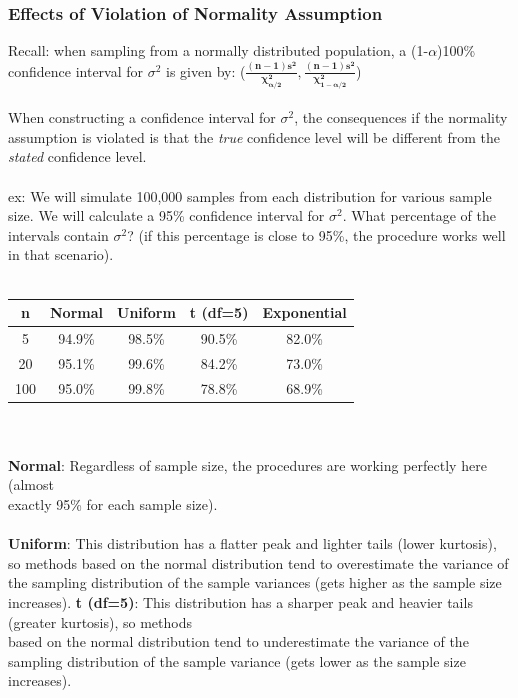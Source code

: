 \documentclass[12pt, a4paper]{article}
\begin{document}
	\subsubsection{Effects of Violation of Normality Assumption}
	Recall: when sampling from a normally distributed population, a (1-$\alpha$)100\% confidence interval for $\sigma^2$ is given by: ($\bm{\frac{(n-1)s^2}{\chi^2_{\alpha/2}}, \frac{(n-1)s^2}{\chi^2_{1-\alpha/2}}}$) \\~\\
	When constructing a confidence interval for $\sigma^2$, the consequences if the normality assumption is violated is that the \textit{true} confidence level will be different from the \textit{stated} confidence level. \\~\\
	ex: We will simulate 100,000 samples from each distribution for various sample size. We will calculate a 95\% confidence interval for $\sigma^2$. What percentage of the intervals contain $\sigma^2$? (if this percentage is close to 95\%, the procedure works well in that scenario). \\~\\
	\begin{tabular}{ |c|c|c|c|c| }
		\hline
		n & Normal & Uniform & t (df=5) & Exponential \\ \hline
		5 & 94.9\% & 98.5\% & 90.5\% & 82.0\% \\
		20 & 95.1\% & 99.6\% & 84.2\% & 73.0\% \\
		100 & 95.0\% & 99.8\% & 78.8\% & 68.9\% \\
		\hline
	\end{tabular} \\~\\
	\textbf{Normal}: Regardless of sample size, the procedures are working perfectly here (almost \\ \hspace*{17mm} exactly 95\% for each sample size). \\~\\
	\textbf{Uniform}: This distribution has a flatter peak and lighter tails (lower kurtosis), so methods \hspace*{20mm} based on the normal distribution tend to overestimate the variance of the sampling \hspace*{20mm} distribution of the sample variances (gets higher as the sample size increases). \newpage
	\noindent \textbf{t (df=5)}: This distribution has a sharper peak and heavier tails (greater kurtosis), so methods \\ \hspace*{19mm} based on the normal distribution tend to underestimate the variance of the sampling \hspace*{19mm} distribution of the sample variance (gets lower as the sample size increases). \\~\\
\end{document}
